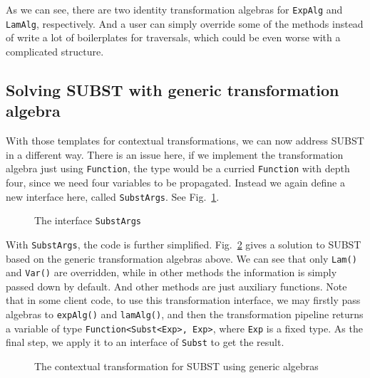 As we can see, there are two identity transformation algebras for \lstinline{ExpAlg} and \lstinline{LamAlg}, respectively. And a user can simply override some of the methods instead of write a lot of boilerplates for traversals, which could be even worse with a complicated structure.

\subsection{Solving SUBST with generic transformation algebra}\label{subsec:solvingsubst}

With those templates for contextual transformations, we can now address SUBST in a different way. There is an issue here, if we implement the transformation algebra just using \lstinline{Function}, the type would be a curried \lstinline{Function} with depth four, since we need four variables to be propagated. Instead we again define a new interface here, called \lstinline{SubstArgs}. See Fig.~\ref{interface_substargs}.

\begin{figure}[tb]
\vspace{-.1in}
\caption{The interface \lstinline{SubstArgs}}
\label{interface_substargs}
\end{figure}

With \lstinline{SubstArgs}, the code is further simplified. Fig.~\ref{capture_avoid_with_id} gives a solution to SUBST based on the generic transformation algebras above. We can see that only \lstinline{Lam()} and \lstinline{Var()} are overridden, while in other methods the information is simply passed down by default. And other methods are just auxiliary functions. Note that in some client code, to use this transformation interface, we may firstly pass algebras to \lstinline{expAlg()} and \lstinline{lamAlg()}, and then the transformation pipeline returns a variable of type \lstinline{Function<Subst<Exp>, Exp>}, where \lstinline{Exp} is a fixed type. As the final step, we apply it to an interface of \lstinline{Subst} to get the result.

\begin{figure}[tb]
\vspace{-.1in}
\caption{The contextual transformation for SUBST using generic algebras}
\label{capture_avoid_with_id}
\end{figure}
